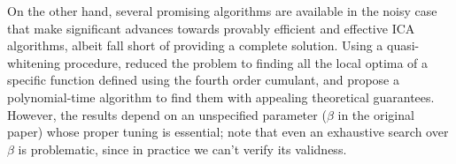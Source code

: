 \documentclass[twoside,11pt]{article}
\begin{document}
On the other hand, several promising algorithms are available in the noisy case that make significant advances towards provably efficient and effective ICA algorithms, albeit fall short of providing a complete solution. 
Using a quasi-whitening procedure, \citet{arora2012provable} reduced the problem to finding all the local optima of a specific function defined using the fourth order cumulant, 
and propose a polynomial-time algorithm to find them with appealing theoretical guarantees. However, the results depend on an unspecified parameter ($\beta$ in the original paper) whose proper tuning is essential; 
note that even an exhaustive search over $\beta$ is problematic, since in practice we can't verify its validness.

\end{document}
